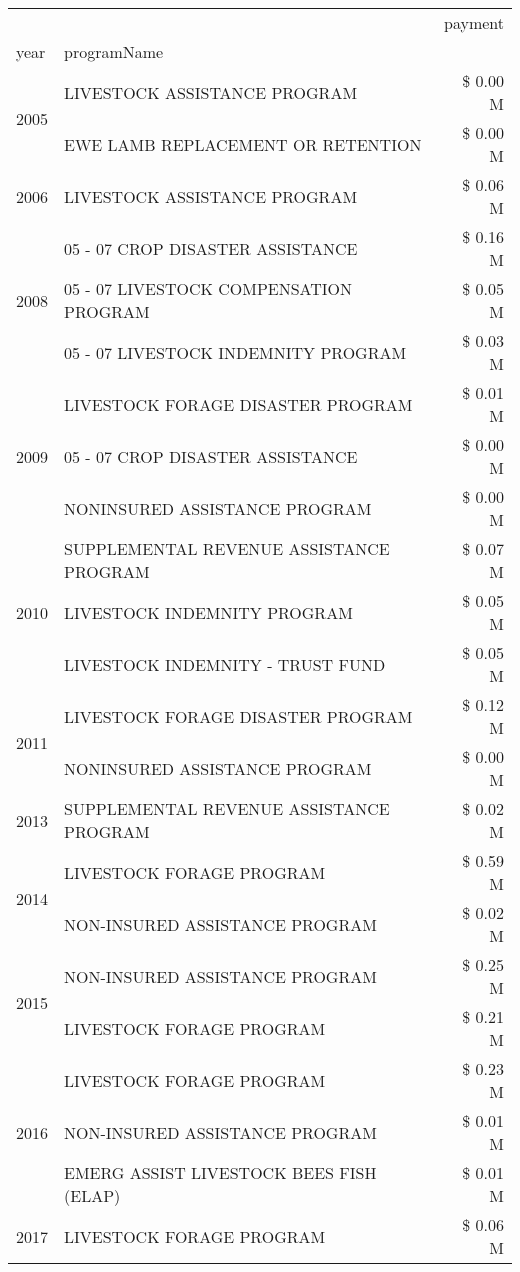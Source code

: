 \begin{tabular}{llr}
\toprule
 &  & payment \\
year & programName &  \\
\midrule
\multirow[t]{2}{*}{2005} & LIVESTOCK ASSISTANCE PROGRAM & \$ 0.00 M \\
 & EWE LAMB REPLACEMENT OR RETENTION & \$ 0.00 M \\
\cline{1-3}
2006 & LIVESTOCK ASSISTANCE PROGRAM & \$ 0.06 M \\
\cline{1-3}
\multirow[t]{3}{*}{2008} & 05 - 07 CROP DISASTER ASSISTANCE & \$ 0.16 M \\
 & 05 - 07 LIVESTOCK COMPENSATION PROGRAM & \$ 0.05 M \\
 & 05 - 07 LIVESTOCK INDEMNITY PROGRAM & \$ 0.03 M \\
\cline{1-3}
\multirow[t]{3}{*}{2009} & LIVESTOCK FORAGE DISASTER  PROGRAM & \$ 0.01 M \\
 & 05 - 07 CROP DISASTER ASSISTANCE & \$ 0.00 M \\
 & NONINSURED ASSISTANCE PROGRAM & \$ 0.00 M \\
\cline{1-3}
\multirow[t]{3}{*}{2010} & SUPPLEMENTAL REVENUE ASSISTANCE PROGRAM & \$ 0.07 M \\
 & LIVESTOCK INDEMNITY PROGRAM & \$ 0.05 M \\
 & LIVESTOCK INDEMNITY - TRUST FUND & \$ 0.05 M \\
\cline{1-3}
\multirow[t]{2}{*}{2011} & LIVESTOCK FORAGE DISASTER PROGRAM & \$ 0.12 M \\
 & NONINSURED ASSISTANCE PROGRAM & \$ 0.00 M \\
\cline{1-3}
2013 & SUPPLEMENTAL REVENUE ASSISTANCE PROGRAM & \$ 0.02 M \\
\cline{1-3}
\multirow[t]{2}{*}{2014} & LIVESTOCK FORAGE PROGRAM & \$ 0.59 M \\
 & NON-INSURED ASSISTANCE PROGRAM & \$ 0.02 M \\
\cline{1-3}
\multirow[t]{2}{*}{2015} & NON-INSURED ASSISTANCE PROGRAM & \$ 0.25 M \\
 & LIVESTOCK FORAGE PROGRAM & \$ 0.21 M \\
\cline{1-3}
\multirow[t]{3}{*}{2016} & LIVESTOCK FORAGE PROGRAM & \$ 0.23 M \\
 & NON-INSURED ASSISTANCE PROGRAM & \$ 0.01 M \\
 & EMERG ASSIST LIVESTOCK BEES FISH (ELAP) & \$ 0.01 M \\
\cline{1-3}
\multirow[t]{2}{*}{2017} & LIVESTOCK FORAGE PROGRAM & \$ 0.06 M \\

\end{tabular}
